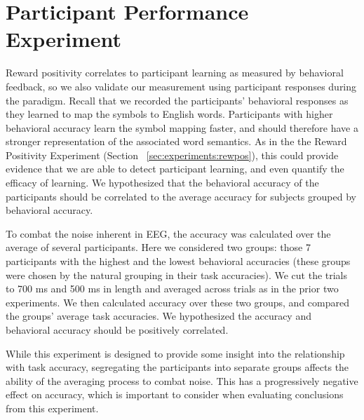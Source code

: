 \section{Participant Performance Experiment}
Reward positivity correlates to participant learning as measured by behavioral 
feedback, so we also validate our measurement using participant responses 
during the paradigm. Recall that we recorded the participants' behavioral 
responses as they learned to map the symbols to English words. Participants 
with higher behavioral accuracy learn the symbol mapping faster, and should 
therefore have a stronger representation of the associated word semantics. As 
in the the Reward Positivity Experiment (Section 
~\ref{sec:experiments:rewpos}), this could provide evidence that we are able to 
detect participant learning, and even quantify the efficacy of learning. We 
hypothesized that the behavioral accuracy of the participants should be 
correlated to the average \tvt accuracy for subjects grouped by behavioral 
accuracy.

To combat the noise inherent in EEG, the \tvt accuracy was calculated over the 
average of several participants. Here we considered two groups: those 7 
participants with the highest and the lowest behavioral accuracies (these 
groups were chosen by the natural grouping in their task accuracies). We cut 
the trials to 700 ms and 500 ms in length and averaged across trials as in the 
prior two experiments. We then calculated \tvt accuracy over these two groups, 
and compared the groups' average task accuracies. We hypothesized the \tvt 
accuracy and behavioral accuracy should be positively correlated.

While this experiment is designed to provide some insight into the relationship 
with task accuracy, segregating the participants into separate groups affects 
the ability of the averaging process to combat noise. This has a progressively 
negative effect on \tvt accuracy, which is important to consider when 
evaluating conclusions from this experiment.
